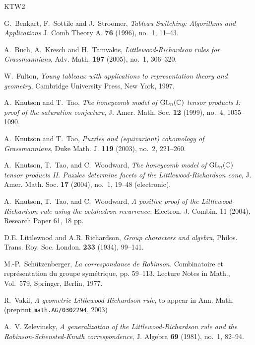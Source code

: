 \documentclass[12pt]{article}
\newcommand{\CC}{\mathbb{C}}
\begin{document}
\begin{thebibliography}{KTW2}

G.~Benkart, F.~Sottile and J.~Stroomer,
\emph{Tableau Switching: Algorithms and Applications}
J. Comb Theory A. \textbf{76} (1996), no.~1, 11--43.

A.~Buch, A.~Kresch and H.~Tamvakis,
\emph{Littlewood-Richardson rules for Grassmannians},
Adv. Math.  \textbf{197} (2005),  no.~1, 306--320. 

W.~Fulton, \emph{{Y}oung tableaux with applications to representation theory
  and geometry}, Cambridge University Press, New York, 1997.

A.~Knutson and T.~Tao, \emph{The honeycomb model of {${\rm GL}_n(\CC)$} tensor
  products {I}: proof of the saturation conjecture}, J. Amer. Math. Soc.
  \textbf{12} (1999), no.~4, 1055--1090.

A.~Knutson and T.~Tao, 
\emph{Puzzles and (equivariant) cohomology of Grassmannians},
Duke Math. J. \textbf{119} (2003), no.~2, 221--260.

A.~Knutson, T.~Tao, and C.~Woodward, \emph{The honeycomb model of {${\rm GL}\sb
  n(\CC)$} tensor products {II}. {P}uzzles determine facets of the
  {L}ittlewood-{R}ichardson cone}, J. Amer. Math. Soc. \textbf{17} (2004),
  no.~1, 19--48 (electronic).

A.~Knutson, T.~Tao, and C.~Woodward, 
\emph{A positive proof of the Littlewood-Richardson rule using the 
octahedron recurrence.}
Electron. J. Combin. 11 (2004), Research Paper 61, 18 pp.

D.E. Littlewood and A.R. Richardson, \emph{Group characters and algebra},
  Philos. Trans. Roy. Soc. London. \textbf{233} (1934), 99--141.


M.-P.~Sch\"utzenberger,
\emph{La correspondance de Robinson.} 
Combinatoire et repr\'esentation du groupe sym\'etrique, 
pp. 59--113. Lecture Notes in Math., Vol.~579, Springer, Berlin, 1977. 

R.~Vakil, \emph{A geometric {L}ittlewood-{R}ichardson rule}, 
to appear in Ann. Math.
(preprint {\tt math.AG/0302294}, 2003)

A.~V. Zelevinsky, \emph{A generalization of the {L}ittlewood-{R}ichardson rule
  and the {R}obinson-{S}chensted-{K}nuth correspondence}, J. Algebra
  \textbf{69} (1981), no.~1, 82--94.
\end{thebibliography}
\end{document}
